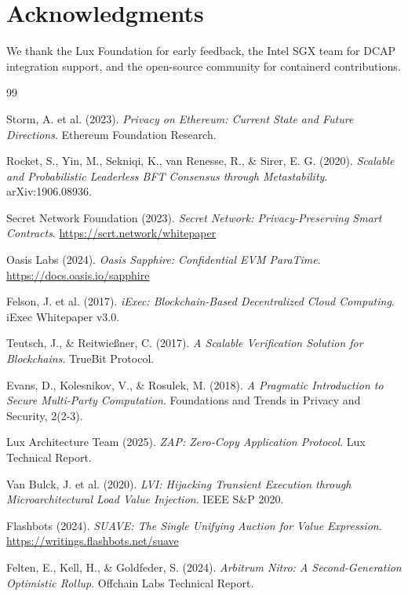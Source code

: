 \section*{Acknowledgments}


We thank the Lux Foundation for early feedback, the Intel SGX team for DCAP integration support, and the open-source community for containerd contributions.

\begin{thebibliography}{99}

Storm, A. et al. (2023). \textit{Privacy on Ethereum: Current State and Future Directions}. Ethereum Foundation Research.

Rocket, S., Yin, M., Sekniqi, K., van Renesse, R., \& Sirer, E. G. (2020). \textit{Scalable and Probabilistic Leaderless BFT Consensus through Metastability}. arXiv:1906.08936.

Secret Network Foundation (2023). \textit{Secret Network: Privacy-Preserving Smart Contracts}. \url{https://scrt.network/whitepaper}

Oasis Labs (2024). \textit{Oasis Sapphire: Confidential EVM ParaTime}. \url{https://docs.oasis.io/sapphire}

Felson, J. et al. (2017). \textit{iExec: Blockchain-Based Decentralized Cloud Computing}. iExec Whitepaper v3.0.

Teutsch, J., \& Reitwießner, C. (2017). \textit{A Scalable Verification Solution for Blockchains}. TrueBit Protocol.

Evans, D., Kolesnikov, V., \& Rosulek, M. (2018). \textit{A Pragmatic Introduction to Secure Multi-Party Computation}. Foundations and Trends in Privacy and Security, 2(2-3).

Lux Architecture Team (2025). \textit{ZAP: Zero-Copy Application Protocol}. Lux Technical Report.

Van Bulck, J. et al. (2020). \textit{LVI: Hijacking Transient Execution through Microarchitectural Load Value Injection}. IEEE S\&P 2020.

Flashbots (2024). \textit{SUAVE: The Single Unifying Auction for Value Expression}. \url{https://writings.flashbots.net/suave}

Felten, E., Kell, H., \& Goldfeder, S. (2024). \textit{Arbitrum Nitro: A Second-Generation Optimistic Rollup}. Offchain Labs Technical Report.


\end{thebibliography}
